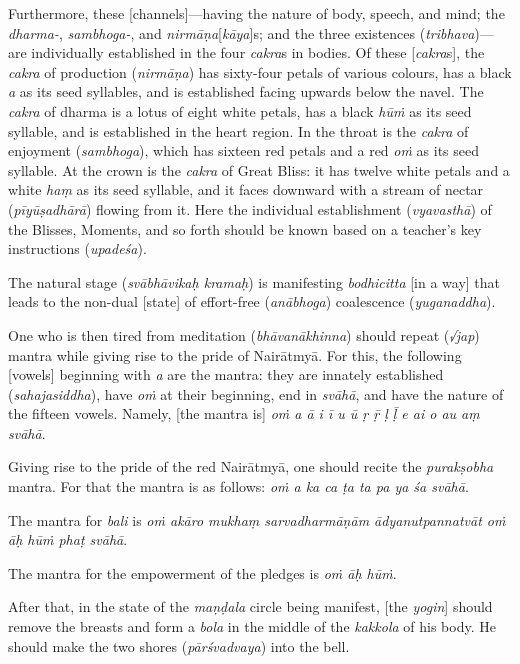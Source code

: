 \documentclass[naipra.tex]{subfiles}
\begin{document}
Furthermore, these [channels]—having the nature of body, speech, and mind; the \emph{dharma-}, \emph{sambhoga-}, and \emph{nirmāṇa}[\emph{kāya}]s; and the three existences (\emph{tribhava})—are individually established in the four \emph{cakra}s in bodies.
Of these [\emph{cakra}s], the \emph{cakra} of production (\emph{nirmāṇa}) has sixty-four petals of various colours, has a black \emph{a} as its seed syllables, and is established facing upwards below the navel.
The \emph{cakra} of dharma is a lotus of eight white petals, has a black \emph{hūṁ} as its seed syllable, and is established in the heart region.
In the throat is the \emph{cakra} of enjoyment (\emph{sambhoga}), which has sixteen red petals and a red \emph{oṁ} as its seed syllable.
At the crown is the \emph{cakra} of Great Bliss: it has twelve white petals and a white \emph{haṃ} as its seed syllable, and it faces downward with a stream of nectar (\emph{pīyūṣadhārā}) flowing from it.
Here the individual establishment (\emph{vyavasthā}) of the Blisses, Moments, and so forth should be known based on a teacher's key instructions (\emph{upadeśa}).

The natural stage (\emph{svābhāvikaḥ kramaḥ}) is manifesting \emph{bodhicitta} [in a way] that leads to the non-dual [state] of effort-free (\emph{anābhoga}) coalescence (\emph{yuganaddha}).

One who is then tired from meditation (\emph{bhāvanākhinna}) should repeat (\emph{√jap}) mantra while giving rise to the pride of Nairātmyā.
For this, the following [vowels] beginning with \emph{a} are the mantra: they are innately established (\emph{sahajasiddha}), have \emph{oṁ} at their beginning, end in \emph{svāhā}, and have the nature of the fifteen vowels.
Namely, [the mantra is] \emph{oṁ a ā i ī u ū ṛ ṝ ḷ ḹ e ai o au aṃ svāhā}.

Giving rise to the pride of the red Nairātmyā, one should recite the \emph{purakṣobha} mantra.
For that the mantra is as follows: \emph{oṁ a ka ca ṭa ta pa ya śa svāhā}.

The mantra for \emph{bali} is \emph{oṁ akāro mukhaṃ sarvadharmāṇām ādyanutpannatvāt oṁ āḥ hūṁ phaṭ svāhā}.

The mantra for the empowerment of the pledges is \emph{oṁ āḥ hūṁ}.

After that, in the state of the \emph{maṇḍala} circle being manifest, [the \emph{yogin}] should remove the breasts and form a \emph{bola} in the middle of the \emph{kakkola} of his body.
He should make the two shores (\emph{pārśvadvaya}) into the bell.
\end{document}
